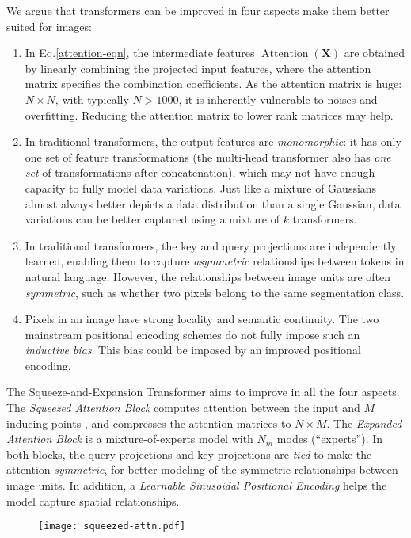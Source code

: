 \documentclass{article}
\begin{document}
We argue that transformers can be improved in four aspects make them better suited for images:
\begin{enumerate}
\item In Eq.\eqref{attention-eqn}, the intermediate features $\operatorname{Attention}(\boldsymbol{X})$ are obtained by linearly combining the projected input features, where the attention matrix specifies the combination coefficients. As the attention matrix is huge: $N\times N$, with typically $N > 1000$, it is inherently vulnerable to noises and  overfitting. Reducing the attention matrix to lower rank matrices may help.
\item In traditional transformers, the output features are \emph{monomorphic}: it has only one set of feature transformations (the multi-head transformer also has \emph{one set} of transformations after concatenation), which may not have enough capacity to fully model data variations. Just like a mixture of Gaussians almost always better depicts a data distribution than a single Gaussian, data variations can be better captured using a mixture of $k$ transformers.
\item In traditional transformers, the key and query projections are independently learned, enabling them to capture \emph{asymmetric} relationships between tokens in natural language. However, the relationships between image units are often \emph{symmetric}, such as whether two pixels belong to the same segmentation class.
\item Pixels in an image have strong locality and semantic continuity. The two mainstream positional encoding schemes \cite{detr,vision-trans} do not fully impose such an \emph{inductive bias}. This bias could be imposed by an improved positional encoding.
\end{enumerate}

The Squeeze-and-Expansion Transformer aims to improve in all the four aspects. The \emph{Squeezed Attention Block} computes attention between the input and $M$ inducing points \cite{set-trans}, and compresses the attention matrices to $N\times M$. The \emph{Expanded Attention Block} is a mixture-of-experts model with $N_m$ modes (``experts''). In both blocks, the query projections and key projections are \emph{tied} to make the attention \emph{symmetric}, for better modeling of the symmetric relationships between image units. In addition, a \emph{Learnable Sinusoidal Positional Encoding} helps the model capture spatial relationships.

\begin{figure}[t]
\centering
  \texttt{[image: squeezed-attn.pdf]}
  \label{fig:sab}
\end{figure}
\end{document}

